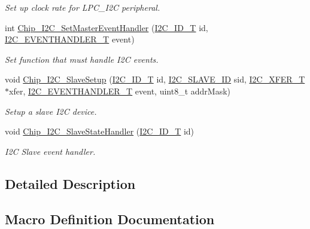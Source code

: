 \begin{DoxyCompactItemize}
\begin{DoxyCompactList}\small\item\em Set up clock rate for L\+P\+C\+\_\+\+I2C peripheral. \end{DoxyCompactList}\item 
int \hyperlink{group__I2C__17XX__40XX_ga1fc3fc0946344e9551d9eef0bbf610b9}{Chip\+\_\+\+I2\+C\+\_\+\+Set\+Master\+Event\+Handler} (\hyperlink{group__I2C__17XX__40XX_ga957556a4d900506cd4cba8427afd81e6}{I2\+C\+\_\+\+I\+D\+\_\+T} id, \hyperlink{group__I2C__17XX__40XX_gaef152f4dc1487d90573810007489082e}{I2\+C\+\_\+\+E\+V\+E\+N\+T\+H\+A\+N\+D\+L\+E\+R\+\_\+T} event)
\begin{DoxyCompactList}\small\item\em Set function that must handle I2C events. \end{DoxyCompactList}\item 
void \hyperlink{group__I2C__17XX__40XX_gaf6ea40668dde26e406f76ff3ddeda527}{Chip\+\_\+\+I2\+C\+\_\+\+Slave\+Setup} (\hyperlink{group__I2C__17XX__40XX_ga957556a4d900506cd4cba8427afd81e6}{I2\+C\+\_\+\+I\+D\+\_\+T} id, \hyperlink{group__I2C__17XX__40XX_ga5fb1ba338fb3822bb6ca012adc4194bf}{I2\+C\+\_\+\+S\+L\+A\+V\+E\+\_\+\+ID} sid, \hyperlink{structI2C__XFER__T}{I2\+C\+\_\+\+X\+F\+E\+R\+\_\+T} $\ast$xfer, \hyperlink{group__I2C__17XX__40XX_gaef152f4dc1487d90573810007489082e}{I2\+C\+\_\+\+E\+V\+E\+N\+T\+H\+A\+N\+D\+L\+E\+R\+\_\+T} event, uint8\+\_\+t addr\+Mask)
\begin{DoxyCompactList}\small\item\em Setup a slave I2C device. \end{DoxyCompactList}\item 
void \hyperlink{group__I2C__17XX__40XX_ga650618a5f4717c46ae3ea304142ddc03}{Chip\+\_\+\+I2\+C\+\_\+\+Slave\+State\+Handler} (\hyperlink{group__I2C__17XX__40XX_ga957556a4d900506cd4cba8427afd81e6}{I2\+C\+\_\+\+I\+D\+\_\+T} id)
\begin{DoxyCompactList}\small\item\em I2C Slave event handler. \end{DoxyCompactList}\end{DoxyCompactItemize}


\subsection{Detailed Description}


\subsection{Macro Definition Documentation}
